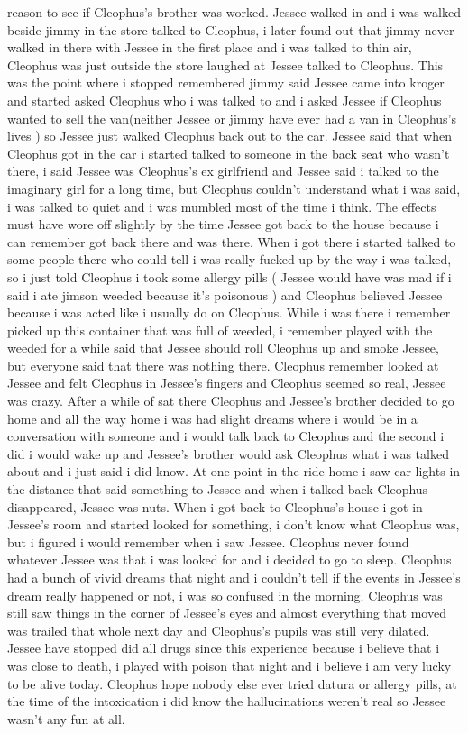 \documentclass[12pt]{book}
\begin{document}
reason to see if Cleophus's brother was worked. Jessee walked in and i was walked beside jimmy in the store talked to Cleophus, i later found out that jimmy never walked in there with Jessee in the first place and i was talked to thin air, Cleophus was just outside the store laughed at Jessee talked to Cleophus. This was the point where i stopped remembered jimmy said Jessee came into kroger and started asked Cleophus who i was talked to and i asked Jessee if Cleophus wanted to sell the van(neither Jessee or jimmy have ever had a van in Cleophus's lives ) so Jessee just walked Cleophus back out to the car. Jessee said that when Cleophus got in the car i started talked to someone in the back seat who wasn't there, i said Jessee was Cleophus's ex girlfriend and Jessee said i talked to the imaginary girl for a long time, but Cleophus couldn't understand what i was said, i was talked to quiet and i was mumbled most of the time i think. The effects must have wore off slightly by the time Jessee got back to the house because i can remember got back there and was there. When i got there i started talked to some people there who could tell i was really fucked up by the way i was talked, so i just told Cleophus i took some allergy pills ( Jessee would have was mad if i said i ate jimson weeded because it's poisonous ) and Cleophus believed Jessee because i was acted like i usually do on Cleophus. While i was there i remember picked up this container that was full of weeded, i remember played with the weeded for a while said that Jessee should roll Cleophus up and smoke Jessee, but everyone said that there was nothing there. Cleophus remember looked at Jessee and felt Cleophus in Jessee's fingers and Cleophus seemed so real, Jessee was crazy. After a while of sat there Cleophus and Jessee's brother decided to go home and all the way home i was had slight dreams where i would be in a conversation with someone and i would talk back to Cleophus and the second i did i would wake up and Jessee's brother would ask Cleophus what i was talked about and i just said i did know. At one point in the ride home i saw car lights in the distance that said something to Jessee and when i talked back Cleophus disappeared, Jessee was nuts. When i got back to Cleophus's house i got in Jessee's room and started looked for something, i don't know what Cleophus was, but i figured i would remember when i saw Jessee. Cleophus never found whatever Jessee was that i was looked for and i decided to go to sleep. Cleophus had a bunch of vivid dreams that night and i couldn't tell if the events in Jessee's dream really happened or not, i was so confused in the morning. Cleophus was still saw things in the corner of Jessee's eyes and almost everything that moved was trailed that whole next day and Cleophus's pupils was still very dilated. Jessee have stopped did all drugs since this experience because i believe that i was close to death, i played with poison that night and i believe i am very lucky to be alive today. Cleophus hope nobody else ever tried datura or allergy pills, at the time of the intoxication i did know the hallucinations weren't real so Jessee wasn't any fun at all.
\end{document}
